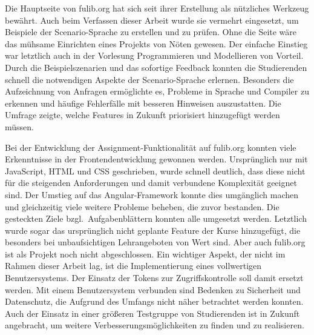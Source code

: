Die Hauptseite von fulib.org hat sich seit ihrer Erstellung als nützliches Werkzeug bewährt.
Auch beim Verfassen dieser Arbeit wurde sie vermehrt eingesetzt, um Beispiele der Scenario-Sprache zu erstellen und zu prüfen.
Ohne die Seite wäre das mühsame Einrichten eines Projekts von Nöten gewesen.
Der einfache Einstieg war letztlich auch in der Vorlesung Programmieren und Modellieren von Vorteil.
Durch die Beispielszenarien und das sofortige Feedback konnten die Studierenden schnell die notwendigen Aspekte der Scenario-Sprache erlernen.
Besonders die Aufzeichnung von Anfragen ermöglichte es, Probleme in Sprache und Compiler zu erkennen und häufige Fehlerfälle mit besseren Hinweisen auszustatten.
Die Umfrage zeigte, welche Features in Zukunft priorisiert hinzugefügt werden müssen.

Bei der Entwicklung der Assignment-Funktionalität auf fulib.org konnten viele Erkenntnisse in der Frontendentwicklung gewonnen werden.
Ursprünglich nur mit JavaScript, HTML und CSS geschrieben, wurde schnell deutlich, dass diese nicht für die steigenden Anforderungen und damit verbundene Komplexität geeignet sind.
Der Umstieg auf das Angular-Framework konnte dies umgänglich machen und gleichzeitig viele weitere Probleme beheben, die zuvor bestanden.
Die gesteckten Ziele bzgl.\ Aufgabenblättern konnten alle umgesetzt werden.
Letztlich wurde sogar das ursprünglich nicht geplante Feature der Kurse hinzugefügt, die besonders bei unbaufsichtigen Lehrangeboten von Wert sind.
Aber auch fulib.org ist als Projekt noch nicht abgeschlossen.
Ein wichtiger Aspekt, der nicht im Rahmen dieser Arbeit lag, ist die Implementierung eines vollwertigen Benutzersystems.
Der Einsatz der Tokens zur Zugriffskontrolle soll damit ersetzt werden.
Mit einem Benutzersystem verbunden sind Bedenken zu Sicherheit und Datenschutz, die Aufgrund des Umfangs nicht näher betrachtet werden konnten.
Auch der Einsatz in einer größeren Testgruppe von Studierenden ist in Zukunft angebracht, um weitere Verbesserungsmöglichkeiten zu finden und zu realisieren.
